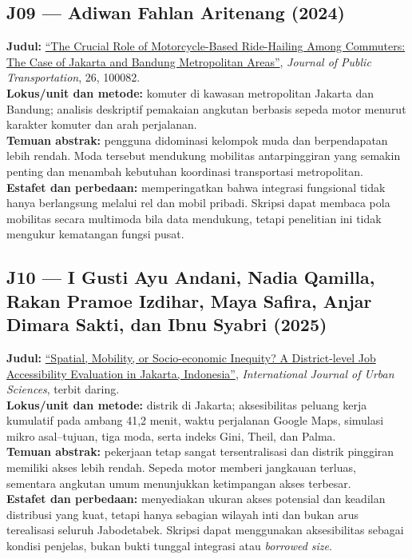 \documentclass[
  indonesian,
  11pt,
  a4paper,
  oneside,
  openany]{report}
\begin{document}
\subsection{J09 --- Adiwan Fahlan Aritenang
(2024)}\label{j09-adiwan-fahlan-aritenang-2024}

\textbf{Judul:}
\href{https://doi.org/10.1016/j.jpubtr.2024.100082}{``The Crucial Role
of Motorcycle-Based Ride-Hailing Among Commuters: The Case of Jakarta
and Bandung Metropolitan Areas''}, \emph{Journal of Public
Transportation}, 26, 100082.\\
\textbf{Lokus/unit dan metode:} komuter di kawasan metropolitan Jakarta
dan Bandung; analisis deskriptif pemakaian angkutan berbasis sepeda
motor menurut karakter komuter dan arah perjalanan.\\
\textbf{Temuan abstrak:} pengguna didominasi kelompok muda dan
berpendapatan lebih rendah. Moda tersebut mendukung mobilitas
antarpinggiran yang semakin penting dan menambah kebutuhan koordinasi
transportasi metropolitan.\\
\textbf{Estafet dan perbedaan:} memperingatkan bahwa integrasi
fungsional tidak hanya berlangsung melalui rel dan mobil pribadi.
Skripsi dapat membaca pola mobilitas secara multimoda bila data
mendukung, tetapi penelitian ini tidak mengukur kematangan fungsi pusat.

\subsection{J10 --- I Gusti Ayu Andani, Nadia Qamilla, Rakan Pramoe
Izdihar, Maya Safira, Anjar Dimara Sakti, dan Ibnu Syabri
(2025)}\label{j10-i-gusti-ayu-andani-nadia-qamilla-rakan-pramoe-izdihar-maya-safira-anjar-dimara-sakti-dan-ibnu-syabri-2025}

\textbf{Judul:}
\href{https://doi.org/10.1080/12265934.2025.2553714}{``Spatial,
Mobility, or Socio-economic Inequity? A District-level Job Accessibility
Evaluation in Jakarta, Indonesia''}, \emph{International Journal of
Urban Sciences}, terbit daring.\\
\textbf{Lokus/unit dan metode:} distrik di Jakarta; aksesibilitas
peluang kerja kumulatif pada ambang 41,2 menit, waktu perjalanan Google
Maps, simulasi mikro asal--tujuan, tiga moda, serta indeks Gini, Theil,
dan Palma.\\
\textbf{Temuan abstrak:} pekerjaan tetap sangat tersentralisasi dan
distrik pinggiran memiliki akses lebih rendah. Sepeda motor memberi
jangkauan terluas, sementara angkutan umum menunjukkan ketimpangan akses
terbesar.\\
\textbf{Estafet dan perbedaan:} menyediakan ukuran akses potensial dan
keadilan distribusi yang kuat, tetapi hanya sebagian wilayah inti dan
bukan arus terealisasi seluruh Jabodetabek. Skripsi dapat menggunakan
aksesibilitas sebagai kondisi penjelas, bukan bukti tunggal integrasi
atau \emph{borrowed size}.
\end{document}
